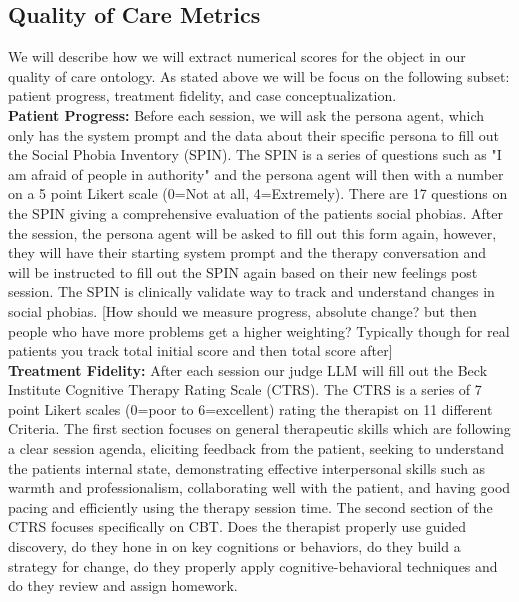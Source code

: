 \documentclass[twoside]{report}
\begin{document}
\subsection{Quality of Care Metrics}
We will describe how we will extract numerical scores for the object in our quality of care ontology. As stated above we will be focus on the following subset: patient progress, treatment fidelity, and case conceptualization. \\

\textbf{Patient Progress:} Before each session, we will ask the persona agent, which only has the system prompt and the data about their specific persona to fill out the Social Phobia Inventory (SPIN). The SPIN is a series of questions such as "I am afraid of people in authority" and the persona agent will then with a number on a 5 point Likert scale (0=Not at all, 4=Extremely). There are 17 questions on the SPIN giving a comprehensive evaluation of the patients social phobias. After the session, the persona agent will be asked to fill out this form again, however, they will have their starting system prompt and the therapy conversation and will be instructed to fill out the SPIN again based on their new feelings post session. The SPIN is clinically validate way to track and understand changes in social phobias. [How should we measure progress, absolute change? but then people who have more problems get a higher weighting? Typically though for real patients you track total initial score and then total score after]\\

\textbf{Treatment Fidelity:} After each session our judge LLM will fill out the Beck Institute Cognitive Therapy Rating Scale (CTRS). The CTRS is a series of 7 point Likert scales (0=poor to 6=excellent) rating the therapist on 11 different Criteria. The first section focuses on general therapeutic skills which are following a clear session agenda, eliciting feedback from the patient, seeking to understand the patients internal state, demonstrating effective interpersonal skills such as warmth and professionalism, collaborating well with the patient, and having good pacing and efficiently using the therapy session time. The second section of the CTRS focuses specifically on CBT. Does the therapist properly use guided discovery, do they hone in on key cognitions or behaviors, do they build a strategy for change, do they properly apply cognitive-behavioral techniques and do they review and assign homework. \\
\end{document}
